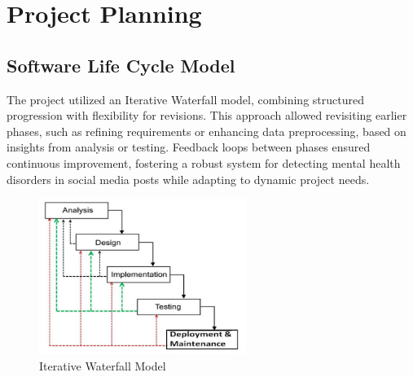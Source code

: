 
\section{Project Planning}

\subsection{Software Life Cycle Model}
\noindent
The project utilized an Iterative Waterfall model, combining structured progression with flexibility for revisions. This approach allowed revisiting earlier phases, such as refining requirements or enhancing data preprocessing, based on insights from analysis or testing. Feedback loops between phases ensured continuous improvement, fostering a robust system for detecting mental health disorders in social media posts while adapting to dynamic project needs.
\vspace{1em}

\begin{figure}[h!]  
    \centering
    \includegraphics[width=0.6\textwidth]{Images/01 Life_cycle.jpg}  
    \caption{Iterative Waterfall Model}
    \label{Iterative Waterfall Model}  %
\end{figure}

